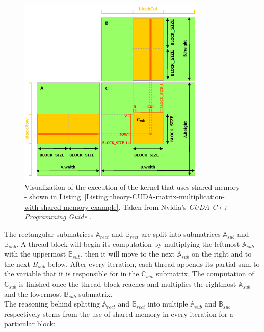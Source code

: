 \begin{figure}[ht!]
	\centering
	\includegraphics[width=0.8\textwidth, keepaspectratio]{images/ch1/CUDA-matrix-multiplication-with-shared-memory.png}
	\caption{Visualization of the execution of the kernel that uses shared memory - shown in Listing~\ref{Listing:theory-CUDA-matrix-multiplication-with-shared-memory-example}. Taken from Nvidia's \emph{CUDA C++ Programming Guide} \cite{NVIDIAMay2022}.}
	\label{Figure:theory-CUDA-matrix-multiplication-with-shared-memory-example}
\end{figure}

The rectangular submatrices $ \mathbb{A}_{rect} $ and $ \mathbb{B}_{rect} $ are split into  submatrices $ \mathbb{A}_{sub} $ and $ \mathbb{B}_{sub} $. A thread block will begin its computation by multiplying the leftmost $ \mathbb{A}_{sub} $ with the uppermost $ \mathbb{B}_{sub} $, then it will move to the next $ \mathbb{A}_{sub} $ on the right and to the next $ B_{sub} $ below. After every iteration, each thread appends its partial sum to the  variable that it is responsible for in the $ \mathbb{C}_{sub} $ submatrix. The computation of $ \mathbb{C}_{sub} $ is finished once the thread block reaches and multiplies the rightmost $ \mathbb{A}_{sub} $ and the lowermost $ \mathbb{B}_{sub} $ submatrix. \\
The reasoning behind splitting $ \mathbb{A}_{rect} $ and $ \mathbb{B}_{rect} $ into multiple $ \mathbb{A}_{sub} $ and $ \mathbb{B}_{sub} $ respectively stems from the use of shared memory in every iteration for a particular block:

